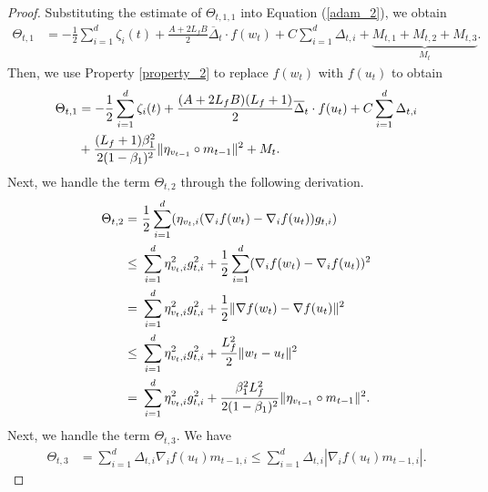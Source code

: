 \documentclass{article} %
\begin{document}
\begin{proof}
Substituting the estimate of $\Theta_{t,1,1}$ into Equation (\ref{adam_2}), we obtain
\begin{align*}
\Theta_{t,1}&=-\frac{1}{2}\sum_{i=1}^{d}\zeta_{i}(t)+\frac{A+2L_{f}B}{2}\overline{\Delta}_{t}\cdot f(w_t)+C\sum_{i=1}^{d}\Delta_{t,i}+\underbrace{M_{t,1}+M_{t,2}+M_{t,3}}_{M_{t}}.
\end{align*}
Then, we use Property \ref{property_2} to replace $f(w_t)$ with $f(u_t)$ to obtain
\begin{align}\label{adam_3}
\Theta_{t,1}&=-\frac{1}{2}\sum_{i=1}^{d}\zeta_{i}(t)+\frac{(A+2L_{f}B)(L_{f}+1)}{2}\overline{\Delta}_{t}\cdot f(u_t)+C\sum_{i=1}^{d}\Delta_{t,i}\notag\\&+\frac{(L_{f}+1)\beta_{1}^{2}}{2(1-\beta_1)^{2}}\|\eta_{v_{t-1}}\circ m_{t-1}\|^{2}+M_{t}.
\end{align}
Next, we handle the term $\Theta_{t,2}$ through the following derivation.
\begin{align}\label{adam_5}
\Theta_{t,2}=&\ \frac{1}{2}\sum_{i=1}^{d}(\eta_{v_{t},i}(\nabla_{i}f(w_{t})-\nabla_{i}f(u_{t}))g_{t,i})\notag\\
\le&\ \sum_{i=1}^{d}\eta^{2}_{v_{t},i}g^{2}_{t,i}+\frac{1}{2}\sum_{i=1}^{d}(\nabla_{i}f(w_{t})-\nabla_{i}f(u_{t}))^{2}\notag\\
=&\ \sum_{i=1}^{d}\eta^{2}_{v_{t},i}g^{2}_{t,i}+\frac{1}{2}\|\nabla f(w_{t})-\nabla f(u_t)\|^{2}\notag\\ 
\le&\ \sum_{i=1}^{d}\eta^{2}_{v_{t},i}g^{2}_{t,i}+\frac{L_{f}^{2}}{2}\|w_{t}-u_{t}\|^{2}\notag\\
=&\ \sum_{i=1}^{d}\eta^{2}_{v_{t},i}g^{2}_{t,i}+\frac{\beta_{1}^{2}L_{f}^{2}}{2(1-\beta_{1})^{2}}\|\eta_{v_{t-1}}\circ m_{t-1}\|^{2}.
\end{align}
Next, we handle the term $\Theta_{t,3}$. We have
{\begin{align}\label{adam_11}
\Theta_{t,3}&=\sum_{i=1}^{d}\Delta_{t,i}\nabla_{i} f(u_{t})m_{t-1,i}\le\sum_{i=1}^{d}\Delta_{t,i}|\nabla_{i} f(u_{t})m_{t-1,i}|.%

\end{align}}
\end{proof}
\end{document}
